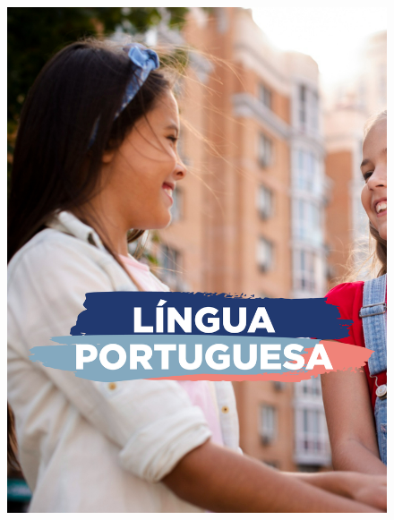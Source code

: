\begin{figure}[htpb]
\vspace*{-2.5cm}
\hspace*{-2.5cm}\includegraphics[height=\paperheight]{../separadores/separadorPOR5A.png}
\end{figure}
\pagebreak
